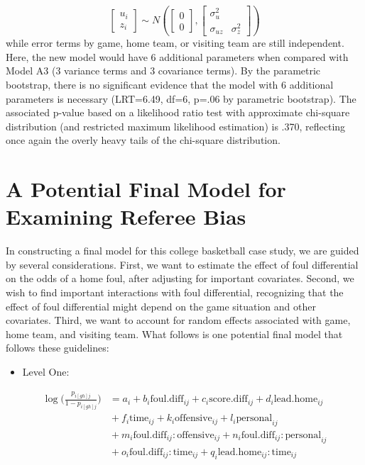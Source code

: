 \documentclass[
]{krantz}
\providecommand{\tightlist}{%
  \setlength{\itemsep}{0pt}\setlength{\parskip}{0pt}}
\begin{document}
\[ \left[ \begin{array}{c}
            u_{i} \\ z_{i}
          \end{array}  \right] \sim N \left( \left[
          \begin{array}{c}
            0 \\ 0
          \end{array} \right], \left[
          \begin{array}{cc}
            \sigma_{u}^{2} & \\
            \sigma_{uz} & \sigma_{z}^{2}
          \end{array} \right] \right) \]
while error terms by game, home team, or visiting team are still independent. Here, the new model would have 6 additional parameters when compared with Model A3 (3 variance terms and 3 covariance terms). By the parametric bootstrap, there is no significant evidence that the model with 6 additional parameters is necessary (LRT=6.49, df=6, p=.06 by parametric bootstrap). The associated p-value based on a likelihood ratio test with approximate chi-square distribution (and restricted maximum likelihood estimation) is .370, reflecting once again the overly heavy tails of the chi-square distribution.

\hypertarget{sec:finalmodel-glmm}{%
\section{A Potential Final Model for Examining Referee Bias}\label{sec:finalmodel-glmm}}

In constructing a final model for this college basketball case study, we are guided by several considerations. First, we want to estimate the effect of foul differential on the odds of a home foul, after adjusting for important covariates. Second, we wish to find important interactions with foul differential, recognizing that the effect of foul differential might depend on the game situation and other covariates. Third, we want to account for random effects associated with game, home team, and visiting team. What follows is one potential final model that follows these guidelines:

\begin{itemize}
\tightlist
\item
  Level One:
\end{itemize}

\begin{align*}
\log\bigg(\frac{p_{i[gh]j}}{1-p_{i[gh]j}}\bigg) & = a_{i} + b_{i}\mathrm{foul.diff}_{ij} + c_{i}\mathrm{score.diff}_{ij} + d_{i}\mathrm{lead.home}_{ij} \\ 
 &{} + f_{i}\mathrm{time}_{ij} + k_{i}\mathrm{offensive}_{ij} + l_{i}\mathrm{personal}_{ij} \\ 
 &{} + m_{i}\mathrm{foul.diff}_{ij}:\mathrm{offensive}_{ij} + n_{i}\mathrm{foul.diff}_{ij}:\mathrm{personal}_{ij} \\ 
 &{} + o_{i}\mathrm{foul.diff}_{ij}:\mathrm{time}_{ij} + q_{i}\mathrm{lead.home}_{ij}:\mathrm{time}_{ij}
\end{align*}
\end{document}
